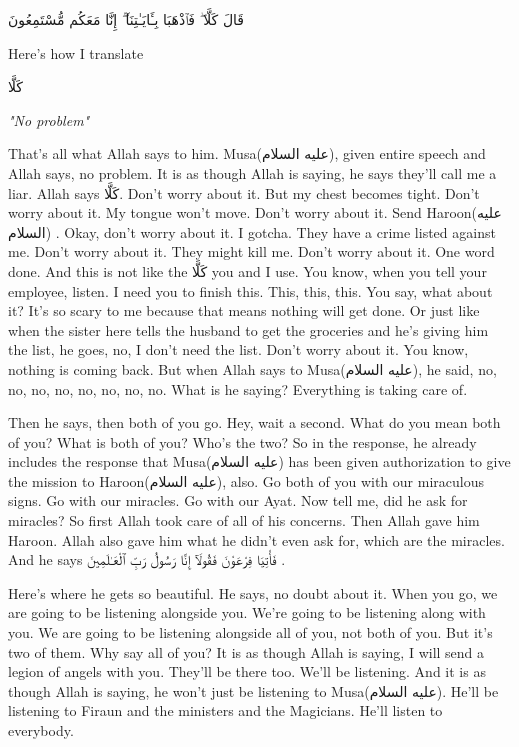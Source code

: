 \documentclass[12pt]{article}
\newcommand{\as}{\textarabic{(عليه السلام)}}
\begin{document}
\textarabic{قَالَ كَلَّا ۖ فَٱذْهَبَا بِـَٔايَـٰتِنَآ ۖ إِنَّا مَعَكُم مُّسْتَمِعُونَ }

Here's how I translate 

\textarabic{كَلَّا} 

\textit{"No problem"} 

That's all what Allah says to him. Musa\as{}, given entire speech and Allah says, no problem. It is as though Allah is saying, he says they'll call me a liar. Allah says \textarabic{كَلَّا}. Don't worry about it. But my chest becomes tight. Don't worry about it. My tongue won't move. Don't worry about it. Send Haroon\as{} . Okay, don't worry about it. I gotcha. They have a crime listed against me. Don't worry about it. They might kill me. Don't worry about it. One word done. And this is not like the \textarabic{كَلَّا} you and I use. You know, when you tell your employee, listen. I need you to finish this. This, this, this. You say, what about it? It's so scary to me because that means nothing will get done. Or just like when the sister here tells the husband to get the groceries and he's giving him the list, he goes, no, I don't need the list. Don't worry about it. You know, nothing is coming back. But when Allah says to Musa\as{}, he said, no, no, no, no, no, no, no, no. What is he saying? Everything is taking care of. 
   
Then he says, then both of you go. Hey, wait a second. What do you mean both of you? What is both of you? Who's the two? So in the response, he already includes the response that Musa\as{} has been given authorization to give the mission to Haroon\as{}, also. Go both of you with our miraculous signs. Go with our miracles. Go with our Ayat. Now tell me, did he ask for miracles? So first Allah took care of all of his concerns. Then Allah gave him Haroon. Allah also gave him what he didn't even ask for, which are the miracles. And he says \textarabic{فَأْتِيَا فِرْعَوْنَ فَقُولَآ إِنَّا رَسُولُ رَبِّ ٱلْعَـٰلَمِينَ }. 
   
Here's where he gets so beautiful. He says, no doubt about it. When you go, we are going to be listening alongside you. We're going to be listening along with you. We are going to be listening alongside all of you, not both of you. But it's two of them. Why say all of you? It is as though Allah is saying, I will send a legion of angels with you. They'll be there too. We'll be listening. And it is as though Allah is saying, he won't just be listening to Musa\as{}. He'll be listening to Firaun and the ministers and the Magicians. He'll listen to everybody.  
   
\end{document}
